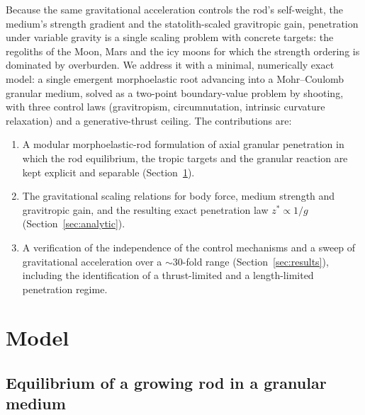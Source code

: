 \documentclass[preprint,12pt]{elsarticle}
\begin{document}
Because the same gravitational acceleration controls the rod's self-weight,
the medium's strength gradient and the statolith-scaled gravitropic gain,
penetration under variable gravity is a single scaling problem with concrete
targets: the regoliths of the Moon, Mars and the icy moons for which the
strength ordering is dominated by overburden. We address it with a minimal,
numerically exact model: a single emergent morphoelastic root advancing into
a Mohr--Coulomb granular medium, solved as a two-point boundary-value problem
by shooting, with three control laws (gravitropism, circumnutation, intrinsic
curvature relaxation) and a generative-thrust ceiling. The contributions are:

\begin{enumerate}
\item A modular morphoelastic-rod formulation of axial granular penetration
in which the rod equilibrium, the tropic targets and the granular reaction
are kept explicit and separable (Section~\ref{sec:model}).
\item The gravitational scaling relations for body force, medium strength and
gravitropic gain, and the resulting exact penetration law
$z^{*}\propto 1/g$ (Section~\ref{sec:analytic}).
\item A verification of the independence of the control mechanisms and a
sweep of gravitational acceleration over a $\sim$30-fold range
(Section~\ref{sec:results}), including the identification of a
thrust-limited and a length-limited penetration regime.
\end{enumerate}

\section{Model}
\label{sec:model}

\subsection{Equilibrium of a growing rod in a granular medium}
\label{sec:eq}
\end{document}
